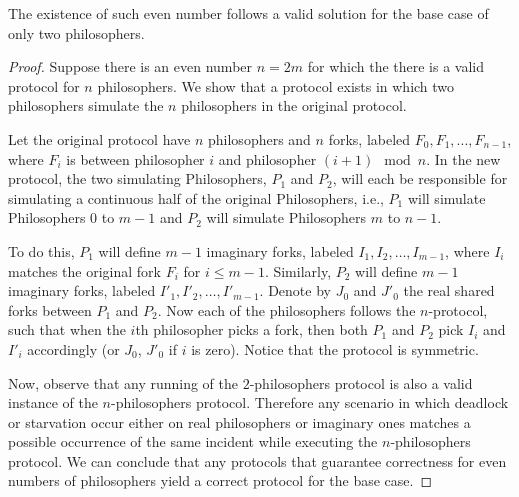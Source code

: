 \documentclass[manuscript,screen,review]{acmart}
\begin{document}
  \begin{lemma} 
  The existence of such even number follows a valid solution for the base case of only two philosophers.
\end{lemma}
\begin{proof}
Suppose there is an even number $n = 2m$ for which the there is a valid protocol for $n$ philosophers. We show that a protocol exists in which two philosophers simulate the $n$ philosophers in the original protocol.

Let the original protocol have $n$ philosophers and $n$ forks, labeled $F_0, F_1, ..., F_{n-1}$, where $F_i$ is between philosopher $i$ and philosopher $(i+1) \mod n$. In the new protocol, the two simulating Philosophers, $P_1$ and $P_2$, will each be responsible for simulating a continuous half of the original Philosophers, i.e., $P_1$ will simulate Philosophers $0$ to $m-1$ and $P_2$ will simulate Philosophers $m$ to $n-1$. 

To do this, $P_1$ will define $m-1$ imaginary forks, labeled $I_1, I_2, \dots, I_{m-1}$, where $I_i$ matches the original fork $F_{i}$ for $i \le m-1$. Similarly, $P_2$ will define $m-1$ imaginary forks, labeled $I'_1, I'_2, \dots, I'_{m-1}$. Denote by $J_{0}$ and $J'_{0}$ the real shared forks between $P_1$ and $P_2$. Now each of the philosophers follows the $n$-protocol, such that when the $i$th philosopher picks a fork, then both $P_1$ and $P_2$ pick $I_i$ and $I'_i$ accordingly (or $J_0$, $J'_0$ if $i$ is zero). Notice that the protocol is symmetric.

Now, observe that any running of the $2$-philosophers protocol is also a valid instance of the $n$-philosophers protocol. Therefore any scenario in which deadlock or starvation occur either on real philosophers or imaginary ones matches a possible occurrence of the same incident while executing the $n$-philosophers protocol. We can conclude that any protocols that guarantee correctness for even numbers of philosophers yield a correct protocol for the base case.
\end{proof}




% 
\printbibliography
\end{document}
